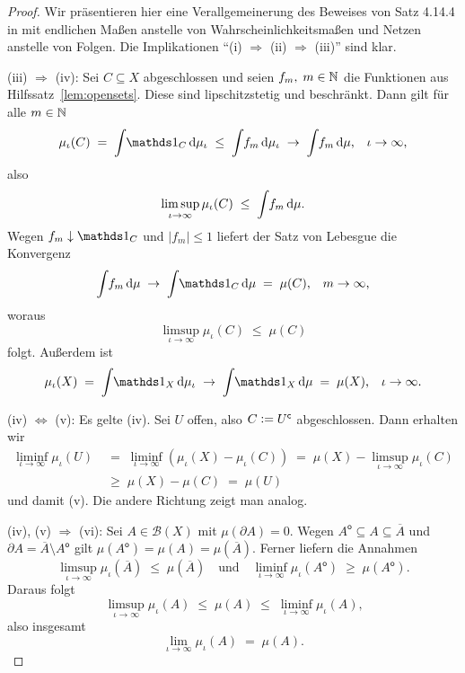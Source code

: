 \documentclass[../main/main.tex]{subfiles}
\begin{document}
	\begin{proof}
		Wir präsentieren hier eine Verallgemeinerung des Beweises von Satz 4.14.4 in \cite[Kapitel 4.14]{Simon.2015} mit endlichen Maßen 
		anstelle von Wahrscheinlichkeitsmaßen und Netzen anstelle von Folgen. Die Implikationen \enquote{(i) $\Rightarrow$ (ii) $\Rightarrow$ (iii)} sind klar. 
		
		(iii) $\Rightarrow$ (iv): Sei $C \subseteq X$ abgeschlossen und seien 
		$f_m, \; m \in \mathbb{N}$ die Funktionen aus Hilfssatz~\ref{lem:opensets}. 
		Diese sind lipschitzstetig und beschränkt.
		Dann gilt für alle $m \in \mathbb{N}$
		$$\mu_\iota(C) \; = \; \measureint{}{\indfct_C}{\mu_\iota} \; \leq \; 
		\measureint{}{f_m}{\mu_\iota} \; \to \;
		\measureint{}{f_m}{\mu} \text{,} \quad \iota \to \infty \text{,}$$
		also 
		$$\limsup_{\iota \to \infty} \mu_\iota(C) \; \leq \; 
		\int_{} \, f_m \, \mathrm{d}\mu \text{.}$$
		Wegen $f_m \convdown \indfct_C$ und $| f_m | \leq 1$ 
		liefert der Satz von Lebesgue die Konvergenz
		$$\measureint{}{f_m}{\mu} \; \to \;
		\measureint{}{\indfct_C}{\mu} \; = \; \mu(C) \text{,} 
		\quad m \to \infty \text{,}$$
		woraus
		$$\limsup_{\iota \to \infty} \mu_\iota(C) \; \leq \; \mu(C)$$
		folgt. Außerdem ist 
		$$\mu_\iota(X) \; = \; \measureint{}{\indfct_{X}}{\mu_\iota} \; \to \; \measureint{}{\indfct_{X}}{\mu} \; = \; \mu(X) \text{,} 
		\quad \iota \to \infty \text{.}$$
		
		(iv) $\Leftrightarrow$ (v): Es gelte (iv). Sei $U$ offen, also 
		$C \vcentcolon = U^\mathsf{c}$ abgeschlossen. Dann erhalten wir
		\begin{align*}
			\liminf_{\iota \to \infty} \mu_\iota(U) \; &= \; \liminf_{\iota \to \infty} (\mu_\iota(X) - \mu_\iota(C)) \; = \;
			\mu(X) - \limsup_{\iota \to \infty} \mu_\iota(C) \\
			&\geq \; 
			\mu(X) - \mu(C) \; = \; \mu(U)
		\end{align*}
		und damit (v). Die andere Richtung zeigt man analog.
		
		(iv), (v) $\Rightarrow$ (vi): Sei $A \in \mathcal{B}(X)$ mit 
		$\mu(\partial A) = 0$. Wegen
		$A^\mathsf{o} \subseteq A \subseteq \overline{A}$ und 
		$\partial A = \overline{A} \setminus A^\mathsf{o}$ gilt $\mu(A^\mathsf{o}) = 
		\mu(A) = \mu(\overline{A}) \text{.}$
		Ferner liefern die Annahmen
		$$\limsup_{\iota \to \infty} \mu_\iota(\overline{A}) \; \leq \; 
		\mu(\overline{A}) \quad \text{und} \quad 
		\liminf_{\iota \to \infty} \mu_\iota(A^\mathsf{o}) \; \geq \; 
		\mu(A^\mathsf{o}) \text{.}$$
		Daraus folgt
		$$\limsup_{\iota \to \infty} \mu_\iota(A) \; \leq \; 
		\mu(A) \; \leq \; \liminf_{\iota \to \infty} \mu_\iota(A) \text{,}$$
		also insgesamt
		$$\lim_{\iota \to \infty} \mu_\iota(A) \; = \; \mu(A) \text{.}$$
		

\end{proof}
\end{document}
